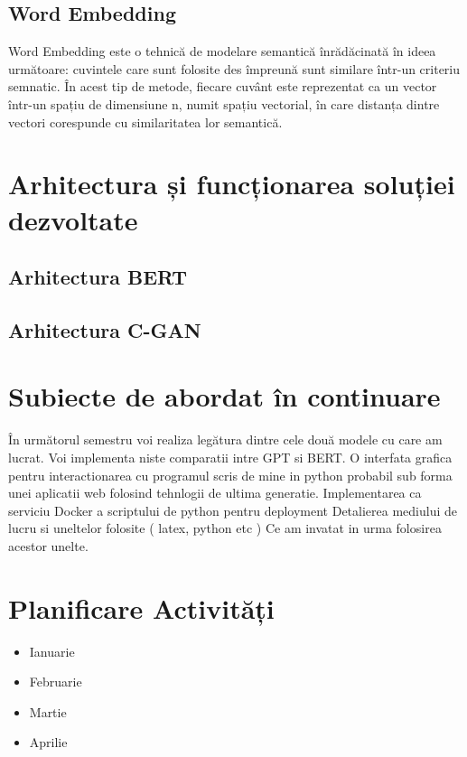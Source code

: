 \documentclass[conference]{IEEEtran}
\begin{document}
\subsection{Word Embedding}
Word Embedding este o tehnică de modelare semantică înrădăcinată în ideea următoare:
cuvintele care sunt folosite des împreună sunt similare într-un criteriu semnatic.
În acest tip de metode, fiecare cuvânt este reprezentat ca un vector într-un spațiu de dimensiune n,
numit spațiu vectorial, în care distanța dintre vectori corespunde cu similaritatea lor semantică.





\section{Arhitectura și funcționarea soluției dezvoltate}

\subsection{Arhitectura BERT}

\subsection{Arhitectura C-GAN}




\section{Subiecte de abordat în continuare}
În următorul semestru voi realiza legătura dintre cele două modele cu care am lucrat.
Voi implementa niste comparatii intre GPT si BERT.
O interfata grafica pentru interactionarea cu programul scris de mine in python
probabil sub forma unei aplicatii web folosind tehnlogii de ultima generatie.
Implementarea ca serviciu Docker a scriptului de python pentru deployment
Detalierea mediului de lucru si uneltelor folosite ( latex, python etc )
Ce am invatat in urma folosirea acestor unelte.

\section{Planificare Activități}
\begin{itemize}
	\item Ianuarie 
	\item Februarie
	\item Martie
	\item Aprilie
\end{itemize}
\end{document}
